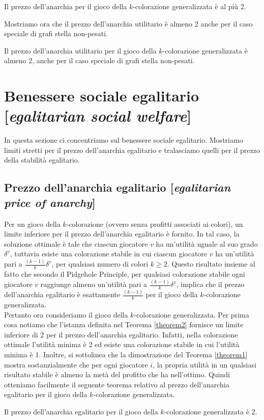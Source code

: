 \begin{theorem}
\label{theorem1}
	Il prezzo dell'anarchia per il gioco della \(k\)-colorazione generalizzata è al più 2. 
\end{theorem}

Mostriamo ora che il prezzo dell'anarchia utilitario è almeno 2 anche per il caso speciale di grafi stella non-pesati.\\

\begin{theorem}
\label{theorem2}
	Il prezzo dell'anarchia utilitario per il gioco della \(k\)-colorazione generalizzata è almeno 2, anche per il caso speciale di grafi stella non-pesati.
\end{theorem}

\section{Benessere sociale egalitario [\textit{egalitarian social welfare}]}
\justify
In questa sezione ci concentriamo sul benessere sociale egalitario. Mostriamo limiti stretti per il prezzo dell'anarchia egalitario e tralasciamo quelli per il prezzo della stabilità egalitario.\\

\subsection{Prezzo dell'anarchia egalitario [\textit{egalitarian price of anarchy}]}
\justify
Per un gioco della \(k\)-colorazione (ovvero senza profitti associati ai colori), un limite inferiore per il prezzo dell'anarchia egalitario è fornito. In tal caso, la soluzione ottimale è tale che ciascun giocatore \(v\) ha un'utilità uguale al suo grado \(\delta^v\), tuttavia esiste una colorazione stabile in cui ciascun giocatore \(v\) ha un'utilità pari a \(\frac{(k-1)}{k} \delta^v\), per qualsiasi numero di colori \(k \geq 2\). Questo risultato insieme al fatto che secondo il Pidgehole Principle, per qualsiasi colorazione stabile ogni giocatore \(v\) raggiunge almeno un'utilità pari a \(\frac{(k-1)}{k} \delta^v\), implica che il prezzo dell'anarchia egalitario è esattamente \(\frac{(k-1)}{k}\) per il gioco della \(k\)-colorazione generalizzata.\\
Pertanto ora consideriamo il gioco della \(k\)-colorazione generalizzata. Per prima cosa notiamo che l'istanza definita nel Teorema \ref{theorem2} fornisce un limite inferiore di 2 per il prezzo dell'anarchia egalitario. Infatti, nella colorazione ottimale l'utilità minima è 2 ed esiste una colorazione stabile in cui l'utilità minima è 1. Inoltre, si sottolinea che la dimostrazione del Teorema \ref{theorem1} mostra sostanzialmente che per ogni giocatore \(i\), la propria utilità in un qualsiasi risultato stabile è almeno la metà del profitto che ha nell'ottimo. Quindi otteniamo facilmente il seguente teorema relativo al prezzo dell'anarchia egalitario per il gioco della \(k\)-colorazione generalizzata.

\begin{theorem}
\label{theorem3}
	Il prezzo dell'anarchia egalitario per il gioco della \(k\)-colorazione generalizzata è 2.
\end{theorem}